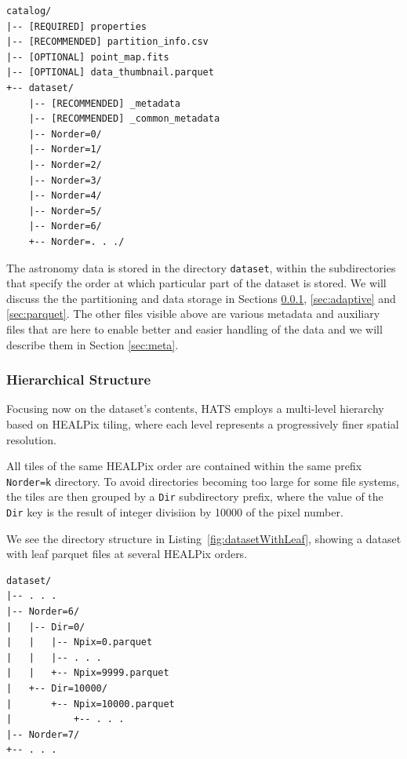 \documentclass[11pt,a4paper]{ivoa}
\begin{document}
\begin{minipage}{\linewidth}
\begin{lstlisting}[caption=Example catalog directory contents, label=fig:exampleCatalogStructure]
catalog/
|-- [REQUIRED] properties
|-- [RECOMMENDED] partition_info.csv
|-- [OPTIONAL] point_map.fits
|-- [OPTIONAL] data_thumbnail.parquet
+-- dataset/
    |-- [RECOMMENDED] _metadata
    |-- [RECOMMENDED] _common_metadata
    |-- Norder=0/
    |-- Norder=1/
    |-- Norder=2/
    |-- Norder=3/
    |-- Norder=4/
    |-- Norder=5/
    |-- Norder=6/
    +-- Norder=. . ./
\end{lstlisting}
\end{minipage}

The astronomy data is stored in the directory \texttt{dataset}, within the subdirectories that specify the order at which particular part of the dataset is stored. 
We will discuss the the partitioning and data storage in Sections \ref{sec:hierarchical}, \ref{sec:adaptive} and \ref{sec:parquet}. 
The other files visible above are various metadata and auxiliary files that are here to enable better and easier handling of the data and we will describe them in Section \ref{sec:meta}. 
    
\subsubsection{Hierarchical Structure} \label{sec:hierarchical}
Focusing now on the dataset's contents, HATS employs a multi-level hierarchy based on HEALPix tiling, where each level represents a progressively finer spatial resolution.

All tiles of the same HEALPix order are contained within the same prefix \texttt{Norder=k} directory. 
To avoid directories becoming too large for some file systems, the tiles are then grouped by a \texttt{Dir} subdirectory prefix,
where the value of the \texttt{Dir} key is the result of integer divisiion by 10000 of the pixel number.

We see the directory structure in Listing~\ref{fig:datasetWithLeaf}, showing a dataset with leaf parquet files at several HEALPix orders.

\begin{minipage}{\linewidth}
\begin{lstlisting}[caption=Example catalog dataset directory contents, label=fig:datasetWithLeaf]
dataset/
|-- . . .
|-- Norder=6/
|   |-- Dir=0/
|   |   |-- Npix=0.parquet
|   |   |-- . . .
|   |   +-- Npix=9999.parquet
|   +-- Dir=10000/
|       +-- Npix=10000.parquet
|           +-- . . .
|-- Norder=7/
+-- . . .
\end{lstlisting} 
\end{minipage}
\end{document}
